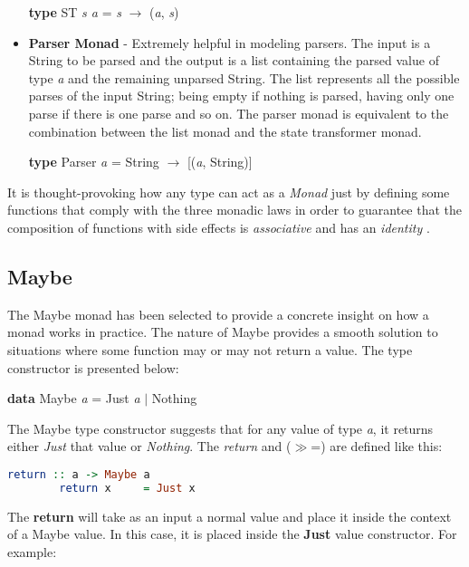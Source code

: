 \documentclass[a4paper, onecolumn]{article}
\begin{document}
\begin{itemize}
        \begin{center}
            \textbf{type} ST \textit{s a} = \textit{s} $\rightarrow$ (\textit{a}, \textit{s})
        \end{center}
        \item \textbf{Parser Monad} - Extremely helpful in modeling parsers. The input is a String to be parsed and the output is a list containing the parsed value of type \textit{a} and the remaining unparsed String. The list represents all the possible parses of the input String; being empty if nothing is parsed, having only one parse if there is one parse and so on. The parser monad is equivalent to the combination between the list monad and the state transformer monad.  
        \begin{center}
            \textbf{type} Parser \textit{a} = String $\rightarrow$ [(\textit{a}, String)] 
        \end{center}
    \end{itemize}
    It is thought-provoking how any type can act as a \textit{Monad} just by defining some functions that comply with the three monadic laws in order to guarantee that the composition of functions with side effects is \textit{associative} and has an \textit{identity} \cite{essenceFP}.
    
    \subsection{Maybe}
    The Maybe monad has been selected to provide a concrete insight on how a monad works in practice. The nature of Maybe provides a smooth solution to situations where some function may or may not return a value. The type constructor is presented below:
    
    \begin{center}
        \textbf{data} Maybe \textit{a} = Just \textit{a} $\vert$ Nothing 
    \end{center}
    The Maybe type constructor suggests that for any value of type \textit{a}, it returns either \textit{Just} that value or \textit{Nothing}. The \textit{return} and ($\gg$=) are defined like this:
    \begin{tcolorbox}
    \begin{lstlisting}[language=Haskell]
        return :: a -> Maybe a
        return x     = Just x 
    \end{lstlisting}
    \end{tcolorbox}
    The \textbf{return} will take as an input a normal value and place it inside the context of a Maybe value. In this case, it is placed inside the \textbf{Just} value constructor. For example: 
    
\end{document}
